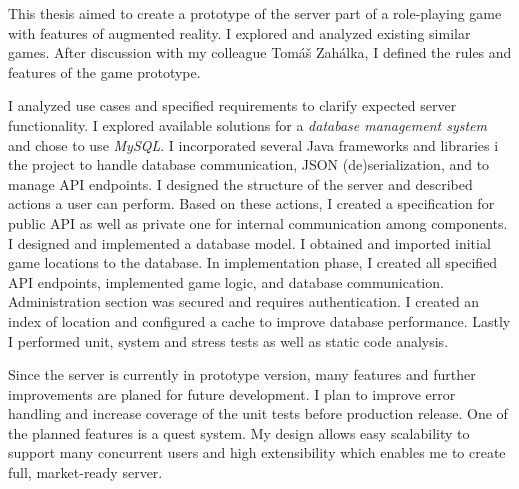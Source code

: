 This thesis aimed to create a prototype of the server part of a role-playing game with features of augmented reality. I explored and analyzed existing similar games. After discussion with my colleague Tomáš Zahálka, I defined the rules and features of the game prototype. 

I analyzed use cases and specified requirements to clarify expected server functionality. I explored available solutions for a \textit{database management system} and chose to use \textit{MySQL}. I incorporated several Java frameworks and libraries i the project to handle database communication, JSON (de)serialization, and to manage API endpoints. I designed the structure of the server and described actions a user can perform. Based on these actions, I created a specification for public API as well as private one for internal communication among components. I designed and implemented a database model. I obtained and imported initial game locations to the database. In implementation phase, I created all specified API endpoints, implemented game logic, and database communication. Administration section was secured and requires authentication. I created an index of location and configured a cache to improve database performance. Lastly I performed unit, system  and stress tests as well as static code analysis.

Since the server is currently in prototype version, many features and further improvements are planed for future development. I plan to improve error handling and increase coverage of the unit tests before production release. One of the planned features is a quest system. My design allows easy scalability to support many concurrent users and high extensibility which enables me to create full, market-ready server.
